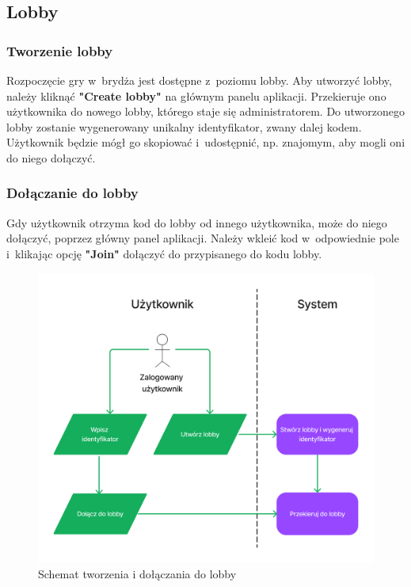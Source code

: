 \FloatBarrier

\subsection{Lobby}
\subsubsection{Tworzenie lobby}

Rozpoczęcie gry w~brydża jest dostępne z~poziomu lobby. Aby utworzyć
lobby, należy kliknąć \textbf{"Create lobby"} na głównym panelu
aplikacji. Przekieruje ono użytkownika do nowego lobby, którego staje
się administratorem. Do utworzonego lobby zostanie wygenerowany
unikalny identyfikator, zwany dalej kodem. Użytkownik będzie mógł go skopiować
i~udostępnić, np. znajomym, aby mogli oni do niego dołączyć.

\subsubsection{Dołączanie do lobby}

Gdy użytkownik otrzyma kod do lobby od innego użytkownika, może
do niego dołączyć, poprzez główny panel aplikacji. Należy wkleić
kod w~odpowiednie pole i~klikając opcję \textbf{"Join"}
dołączyć do przypisanego do kodu lobby.

\begin{figure}[h!]
  \centering
  \includegraphics[width=\textwidth]{img/schematy/create_join_lobby.png}
  \caption{Schemat tworzenia i dołączania do lobby}
\end{figure}

